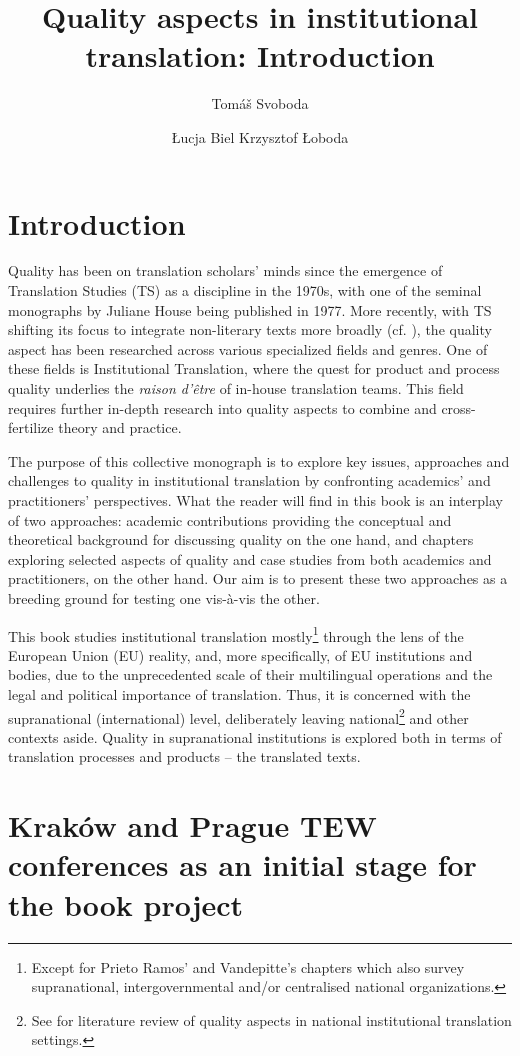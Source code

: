 \documentclass[output=paper]{langsci/langscibook}
\author{Tomáš Svoboda\affiliation{Charles University, Prague}\and 
Łucja Biel\affiliation{University of Warsaw}\lastand
Krzysztof Łoboda\affiliation{Jagiellonian University, Kraków}}
\title{Quality aspects in institutional translation: Introduction}
\begin{document}
  
\section{Introduction}

Quality has been on translation scholars’ minds since the emergence of Translation Studies (TS) as a discipline in the 1970s, with one of the seminal monographs by Juliane House being published in 1977. More recently, with TS shifting its focus to integrate non-literary texts more broadly (cf. \citealt{Rogers2015}), the quality aspect has been researched across various specialized fields and genres. One of these fields is Institutional Translation, where the quest for product and process quality underlies the \textit{raison d'être} of in-house translation teams. This field requires further in-depth research into quality aspects to combine and cross-fertilize theory and practice.

The purpose of this collective monograph is to explore key issues, approaches and challenges to quality in institutional translation by confronting academics’ and practitioners’ perspectives. What the reader will find in this book is an interplay of two approaches: academic contributions providing the conceptual and theoretical background for discussing quality on the one hand, and chapters exploring selected aspects of quality and case studies from both academics and practitioners, on the other hand. Our aim is to present these two approaches as a breeding ground for testing one vis-à-vis the other. 

This book studies institutional translation mostly\footnote{Except for Prieto Ramos’ and Vandepitte’s chapters which also survey supranational, intergovernmental and/or centralised national organizations.} through the lens of the European Union (EU) reality, and, more specifically, of EU institutions and bodies, due to the unprecedented scale of their multilingual operations and the legal and political importance of translation. Thus, it is concerned with the supranational (international) level, deliberately leaving national\footnote{See \citet{Svoboda2017} for literature review of quality aspects in national institutional translation settings.} and other contexts aside. Quality in supranational institutions is explored both in terms of translation processes and products – the translated texts. 

\section{Kraków and Prague TEW conferences as an initial stage for the book project}
\end{document}
